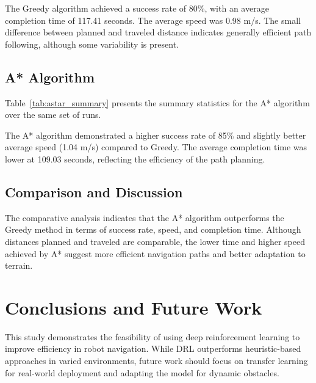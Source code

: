 \documentclass[11pt,twocolumn]{article}
\begin{document}
The Greedy algorithm achieved a success rate of 80\%, with an average completion time of 117.41 seconds. The average speed was 0.98 m/s. The small difference between planned and traveled distance indicates generally efficient path following, although some variability is present.

\subsection{A* Algorithm}

Table~\ref{tab:astar_summary} presents the summary statistics for the A* algorithm over the same set of runs.

\begin{table}[ht]
\centering
\caption{Summary statistics for the A* algorithm (100 runs).}
\label{tab:astar_summary}
\end{table}

The A* algorithm demonstrated a higher success rate of 85\% and slightly better average speed (1.04 m/s) compared to Greedy. The average completion time was lower at 109.03 seconds, reflecting the efficiency of the path planning.

\subsection{Comparison and Discussion}

The comparative analysis indicates that the A* algorithm outperforms the Greedy method in terms of success rate, speed, and completion time. Although distances planned and traveled are comparable, the lower time and higher speed achieved by A* suggest more efficient navigation paths and better adaptation to terrain.


\section{Conclusions and Future Work}

This study demonstrates the feasibility of using deep reinforcement learning to improve efficiency in robot navigation. While DRL outperforms heuristic-based approaches in varied environments, future work should focus on transfer learning for real-world deployment and adapting the model for dynamic obstacles.



\end{document}
